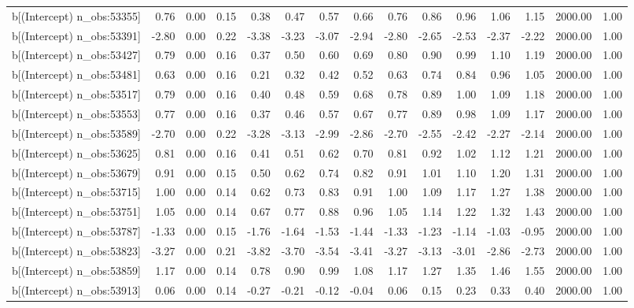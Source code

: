 \begin{table}[ht]
\begin{tabular}{rrrrrrrrrrrrrrr}
  b[(Intercept) n\_obs:53355] & 0.76 & 0.00 & 0.15 & 0.38 & 0.47 & 0.57 & 0.66 & 0.76 & 0.86 & 0.96 & 1.06 & 1.15 & 2000.00 & 1.00 \\ 
  b[(Intercept) n\_obs:53391] & -2.80 & 0.00 & 0.22 & -3.38 & -3.23 & -3.07 & -2.94 & -2.80 & -2.65 & -2.53 & -2.37 & -2.22 & 2000.00 & 1.00 \\ 
  b[(Intercept) n\_obs:53427] & 0.79 & 0.00 & 0.16 & 0.37 & 0.50 & 0.60 & 0.69 & 0.80 & 0.90 & 0.99 & 1.10 & 1.19 & 2000.00 & 1.00 \\ 
  b[(Intercept) n\_obs:53481] & 0.63 & 0.00 & 0.16 & 0.21 & 0.32 & 0.42 & 0.52 & 0.63 & 0.74 & 0.84 & 0.96 & 1.05 & 2000.00 & 1.00 \\ 
  b[(Intercept) n\_obs:53517] & 0.79 & 0.00 & 0.16 & 0.40 & 0.48 & 0.59 & 0.68 & 0.78 & 0.89 & 1.00 & 1.09 & 1.18 & 2000.00 & 1.00 \\ 
  b[(Intercept) n\_obs:53553] & 0.77 & 0.00 & 0.16 & 0.37 & 0.46 & 0.57 & 0.67 & 0.77 & 0.89 & 0.98 & 1.09 & 1.17 & 2000.00 & 1.00 \\ 
  b[(Intercept) n\_obs:53589] & -2.70 & 0.00 & 0.22 & -3.28 & -3.13 & -2.99 & -2.86 & -2.70 & -2.55 & -2.42 & -2.27 & -2.14 & 2000.00 & 1.00 \\ 
  b[(Intercept) n\_obs:53625] & 0.81 & 0.00 & 0.16 & 0.41 & 0.51 & 0.62 & 0.70 & 0.81 & 0.92 & 1.02 & 1.12 & 1.21 & 2000.00 & 1.00 \\ 
  b[(Intercept) n\_obs:53679] & 0.91 & 0.00 & 0.15 & 0.50 & 0.62 & 0.74 & 0.82 & 0.91 & 1.01 & 1.10 & 1.20 & 1.31 & 2000.00 & 1.00 \\ 
  b[(Intercept) n\_obs:53715] & 1.00 & 0.00 & 0.14 & 0.62 & 0.73 & 0.83 & 0.91 & 1.00 & 1.09 & 1.17 & 1.27 & 1.38 & 2000.00 & 1.00 \\ 
  b[(Intercept) n\_obs:53751] & 1.05 & 0.00 & 0.14 & 0.67 & 0.77 & 0.88 & 0.96 & 1.05 & 1.14 & 1.22 & 1.32 & 1.43 & 2000.00 & 1.00 \\ 
  b[(Intercept) n\_obs:53787] & -1.33 & 0.00 & 0.15 & -1.76 & -1.64 & -1.53 & -1.44 & -1.33 & -1.23 & -1.14 & -1.03 & -0.95 & 2000.00 & 1.00 \\ 
  b[(Intercept) n\_obs:53823] & -3.27 & 0.00 & 0.21 & -3.82 & -3.70 & -3.54 & -3.41 & -3.27 & -3.13 & -3.01 & -2.86 & -2.73 & 2000.00 & 1.00 \\ 
  b[(Intercept) n\_obs:53859] & 1.17 & 0.00 & 0.14 & 0.78 & 0.90 & 0.99 & 1.08 & 1.17 & 1.27 & 1.35 & 1.46 & 1.55 & 2000.00 & 1.00 \\ 
  b[(Intercept) n\_obs:53913] & 0.06 & 0.00 & 0.14 & -0.27 & -0.21 & -0.12 & -0.04 & 0.06 & 0.15 & 0.23 & 0.33 & 0.40 & 2000.00 & 1.00 \\ 

\end{tabular}
\end{table}
